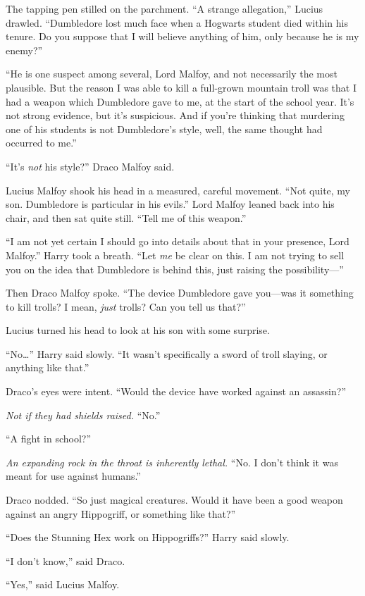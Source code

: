 The tapping pen stilled on the parchment. “A strange allegation,” Lucius drawled. “Dumbledore lost much face when a Hogwarts student died within his tenure. Do you suppose that I will believe anything of him, only because he is my enemy?”

“He is one suspect among several, Lord Malfoy, and not necessarily the most plausible. But the reason I was able to kill a full-grown mountain troll was that I had a weapon which Dumbledore gave to me, at the start of the school year. It’s not strong evidence, but it’s suspicious. And if you’re thinking that murdering one of his students is not Dumbledore’s style, well, the same thought had occurred to me.”

“It’s \emph{not} his style?” Draco Malfoy said.

Lucius Malfoy shook his head in a measured, careful movement. “Not quite, my son. Dumbledore is particular in his evils.” Lord Malfoy leaned back into his chair, and then sat quite still. “Tell me of this weapon.”

“I am not yet certain I should go into details about that in your presence, Lord Malfoy.” Harry took a breath. “Let \emph{me} be clear on this. I am not trying to sell you on the idea that Dumbledore is behind this, just raising the possibility—”

Then Draco Malfoy spoke. “The device Dumbledore gave you—was it something to kill trolls? I mean, \emph{just} trolls? Can you tell us that?”

Lucius turned his head to look at his son with some surprise.

“No…” Harry said slowly. “It wasn’t specifically a sword of troll slaying, or anything like that.”

Draco’s eyes were intent. “Would the device have worked against an assassin?”

\emph{Not if they had shields raised.} “No.”

“A fight in school?”

\emph{An expanding rock in the throat is inherently lethal.} “No. I don’t think it was meant for use against humans.”

Draco nodded. “So just magical creatures. Would it have been a good weapon against an angry Hippogriff, or something like that?”

“Does the Stunning Hex work on Hippogriffs?” Harry said slowly.

“I don’t know,” said Draco.

“Yes,” said Lucius Malfoy.

